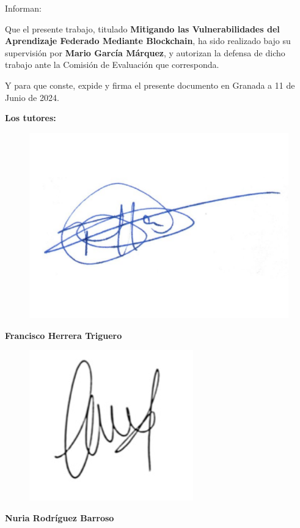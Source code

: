 \documentclass[oneside,openright,titlepage,numbers=noenddot,openany,headinclude,footinclude=true,
cleardoublepage=empty,abstractoff,BCOR=5mm,paper=a4,fontsize=12pt,main=spanish]{scrreprt}
\begin{document}
\vspace{8em}

Informan:

Que el presente trabajo, titulado \textbf{Mitigando las Vulnerabilidades del Aprendizaje Federado Mediante Blockchain}, ha sido realizado bajo su supervisión por \textbf{Mario García Márquez}, y autorizan la defensa de dicho trabajo ante la Comisión de Evaluación que corresponda.

Y para que conste, expide y firma el presente documento en Granada a 11 de Junio de 2024.


\vspace{10em}

\textbf{Los tutores:}

\begin{minipage}{0.45\textwidth}
\begin{figure}[H]
    \includegraphics[scale = 0.4]{firma_paco.png}
\end{figure}
\textbf{Francisco Herrera Triguero}
\end{minipage}
\begin{minipage}{0.45\textwidth}
\vspace{2.3cm}

\begin{figure}[H]
    \includegraphics[scale = 0.75]{firma_nuria.png}
\end{figure}
\textbf{Nuria Rodríguez Barroso}
\end{minipage}
\end{document}
